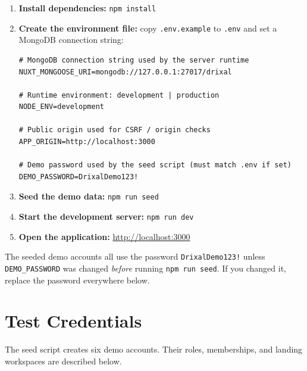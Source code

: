 \documentclass[11pt,a4paper]{article}
\begin{document}
\begin{enumerate}[leftmargin=2em, itemsep=2pt]
  \item \textbf{Install dependencies:} \texttt{npm install}
  \item \textbf{Create the environment file:} copy \texttt{.env.example} to \texttt{.env} and set a MongoDB connection string:
  \begin{lstlisting}[style=drixal]
# MongoDB connection string used by the server runtime
NUXT_MONGOOSE_URI=mongodb://127.0.0.1:27017/drixal

# Runtime environment: development | production
NODE_ENV=development

# Public origin used for CSRF / origin checks
APP_ORIGIN=http://localhost:3000

# Demo password used by the seed script (must match .env if set)
DEMO_PASSWORD=DrixalDemo123!
  \end{lstlisting}
  \item \textbf{Seed the demo data:} \texttt{npm run seed}
  \item \textbf{Start the development server:} \texttt{npm run dev}
  \item \textbf{Open the application:} \url{http://localhost:3000}
\end{enumerate}

\begin{notebox}
  The seeded demo accounts all use the password \texttt{DrixalDemo123!} unless \texttt{DEMO\_PASSWORD} was changed \emph{before} running \texttt{npm run seed}. If you changed it, replace the password everywhere below.
\end{notebox}

\section{Test Credentials}
\label{sec:credentials}

The seed script creates six demo accounts. Their roles, memberships, and landing workspaces are described below.
\end{document}
